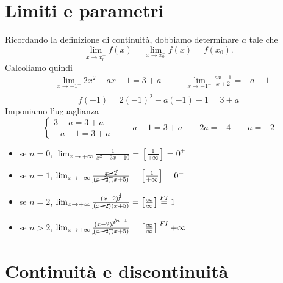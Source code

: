\documentclass{book}     %
\begin{document}
\section{Limiti e parametri}
\begin{ex}
    [
        Trovare per quale valore di $a$ la funzione 
        \[f(x)=\begin{cases}
            2x^2-ax+1 &  x\leq -1\\
            \frac{ax-1}{x+2} &  x>1
        \end{cases}\]
        è continua in $x_0=-1$.
    ]
    Ricordando la definizione di continuità, dobbiamo determinare $a$ tale che
    \[\lim_{x\to x_0^+}f(x)=\lim_{x\to x_0^-}f(x)=f(x_0).\]
    Calcoliamo quindi 
    \[\begin{aligned}
        &\lim_{x\to-1^-}2x^2-ax+1= 3+a\qquad
        &\lim_{x\to-1^-}\frac{ax-1}{x+2}= -a-1\\
    \end{aligned}\]
    \[f(-1)= 2(-1)^2-a(-1)+1= 3+a\]
    Imponiamo l'uguaglianza
    \[\begin{cases}
        3+a=3+a\\
        -a-1=3+a
    \end{cases}\quad-a-1=3+a\qquad 2a=-4\qquad \boxed{a=-2}\]
\end{ex}
\begin{ex}
    \begin{itemize}
        \item se $n=0$, \quad $\lim_{x\to +\infty}\frac{1}{x^2+3x-10}= \left[ \frac{1}{+\infty}\right]=0^+$
        \item se $n=1$, \quad $\lim_{x\to +\infty}\frac{\cancel{x-2}}{\cancel{(x-2)}(x+5)}= \left[ \frac{1}{+\infty}\right]=0^+$
        \item se $n=2$, \quad $\lim_{x\to +\infty}\frac{(x-2)^{\cancel{2}}}{\cancel{(x-2)}(x+5)}= \left[ \frac{\infty}{\infty}\right]\overset{FI}{=}1$
        \item se $n>2$, \quad $\lim_{x\to +\infty}\frac{(x-2)^{\cancel{n}^{n-1}}}{\cancel{(x-2)}(x+5)}= \left[ \frac{\infty}{\infty}\right]\overset{FI}{=}+\infty$
    \end{itemize}
\end{ex}
\section{Continuità e discontinuità}
\end{document}
